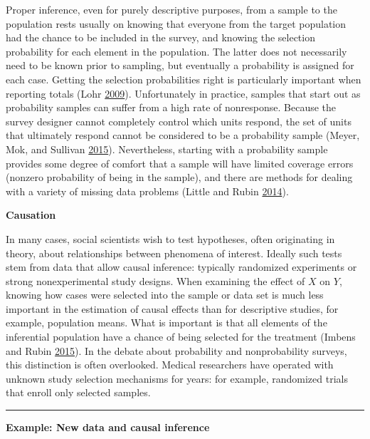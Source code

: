 \documentclass[]{krantz}
\begin{document}
Proper inference, even for purely descriptive purposes, from a sample to
the population rests usually on knowing that everyone from the target
population had the chance to be included in the survey, and knowing the
selection probability for each element in the population. The latter
does not necessarily need to be known prior to sampling, but eventually
a probability is assigned for each case. Getting the selection
probabilities right is particularly important when reporting totals
(Lohr \protect\hyperlink{ref-lohr2009sampling}{2009}). Unfortunately in
practice, samples that start out as probability samples can suffer from
a high rate of nonresponse. Because the survey designer cannot
completely control which units respond, the set of units that ultimately
respond cannot be considered to be a probability sample (Meyer, Mok, and
Sullivan \protect\hyperlink{ref-Meyer2015}{2015}). Nevertheless,
starting with a probability sample provides some degree of comfort that
a sample will have limited coverage errors (nonzero probability of being
in the sample), and there are methods for dealing with a variety of
missing data problems (Little and Rubin
\protect\hyperlink{ref-little2014statistical}{2014}).

\textbf{Causation}

In many cases, social scientists wish to test hypotheses, often
originating in theory, about relationships between phenomena of
interest. Ideally such tests stem from data that allow causal inference:
typically randomized experiments or strong nonexperimental study
designs. When examining the effect of \(X\) on \(Y\), knowing how cases
were selected into the sample or data set is much less important in the
estimation of causal effects than for descriptive studies, for example,
population means. What is important is that all elements of the
inferential population have a chance of being selected for the treatment
(Imbens and Rubin \protect\hyperlink{ref-imbens2015causal}{2015}). In
the debate about probability and nonprobability surveys, this
distinction is often overlooked. Medical researchers have operated with
unknown study selection mechanisms for years: for example, randomized
trials that enroll only selected samples.

\begin{center}\rule{0.5\linewidth}{\linethickness}\end{center}

\textbf{Example: New data and causal inference}
\end{document}

